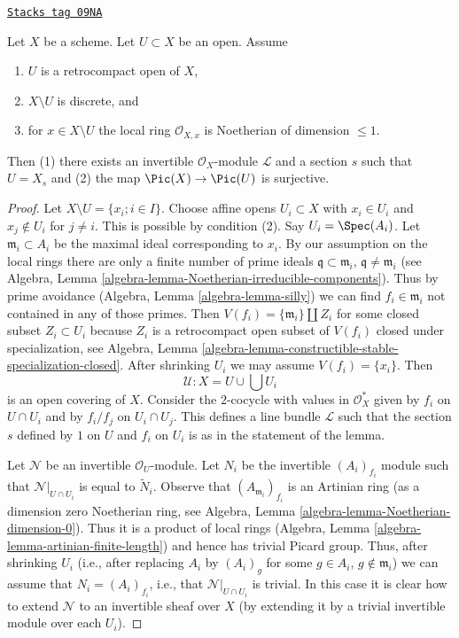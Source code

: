 \begin{lemma}
\label{varieties-lemma-complement-codim-1-closed-points}
\href{https://stacks.math.columbia.edu/tag/09NA}{\texttt{Stacks tag 09NA}}

Let $X$ be a scheme. Let $U \subset X$ be an open. Assume
\begin{enumerate}
\item $U$ is a retrocompact open of $X$,
\item $X \setminus U$ is discrete, and
\item for $x \in X \setminus U$ the local ring
$\mathcal{O}_{X, x}$ is Noetherian of dimension $\leq 1$.
\end{enumerate}
Then (1) there exists an invertible $\mathcal{O}_X$-module $\mathcal{L}$
and a section $s$ such that $U = X_s$ and (2) the map
$\Pic(X) \to \Pic(U)$ is surjective.
\end{lemma}

\begin{proof}
Let $X \setminus U = \{x_i; i \in I\}$.
Choose affine opens $U_i \subset X$ with $x_i \in U_i$ and
$x_j \not \in U_i$ for $j \not = i$. This is possible by condition (2).
Say $U_i = \Spec(A_i)$. Let $\mathfrak m_i \subset A_i$ be the maximal
ideal corresponding to $x_i$. By our assumption on the local rings
there are only a finite number of prime ideals
$\mathfrak q \subset \mathfrak m_i$,
$\mathfrak q \not = \mathfrak m_i$ (see
Algebra, Lemma \ref{algebra-lemma-Noetherian-irreducible-components}).
Thus by prime avoidance (Algebra, Lemma
\ref{algebra-lemma-silly}) we can find $f_i \in \mathfrak m_i$
not contained in any of those primes. Then
$V(f_i) = \{\mathfrak m_i\} \amalg Z_i$ for some closed subset
$Z_i \subset U_i$ because $Z_i$ is a retrocompact open subset of
$V(f_i)$ closed under specialization, see
Algebra, Lemma \ref{algebra-lemma-constructible-stable-specialization-closed}.
After shrinking $U_i$ we may assume $V(f_i) = \{x_i\}$. Then
$$
\mathcal{U} : X = U \cup \bigcup U_i
$$
is an open covering of $X$. Consider the $2$-cocycle with values
in $\mathcal{O}_X^*$ given by $f_i$ on $U \cap U_i$ and by
$f_i/f_j$ on $U_i \cap U_j$. This defines a line bundle
$\mathcal{L}$ such that the section $s$ defined by $1$ on $U$
and $f_i$ on $U_i$ is as in the statement of the lemma.

\medskip\noindent
Let $\mathcal{N}$ be an invertible $\mathcal{O}_U$-module.
Let $N_i$ be the invertible $(A_i)_{f_i}$ module such that
$\mathcal{N}|_{U \cap U_i}$ is equal to $\tilde N_i$.
Observe that $(A_{\mathfrak m_i})_{f_i}$ is an Artinian ring
(as a dimension zero Noetherian ring, see
Algebra, Lemma \ref{algebra-lemma-Noetherian-dimension-0}).
Thus it is a product of local rings
(Algebra, Lemma \ref{algebra-lemma-artinian-finite-length}) and
hence has trivial Picard group. Thus, after shrinking $U_i$
(i.e., after replacing $A_i$ by $(A_i)_g$ for some $g \in A_i$,
$g \not \in \mathfrak m_i$)
we can assume that $N_i = (A_i)_{f_i}$, i.e., that
$\mathcal{N}|_{U \cap U_i}$ is trivial. In this case it is
clear how to extend $\mathcal{N}$ to an invertible sheaf over $X$
(by extending it by a trivial invertible module over each $U_i$).
\end{proof}

